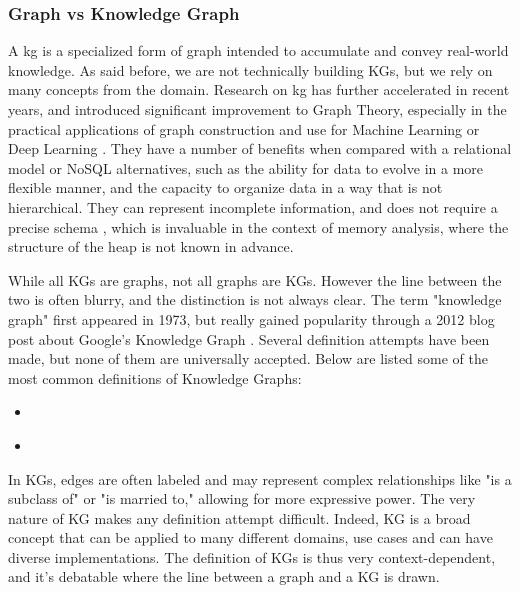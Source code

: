     \subsubsection{Graph vs Knowledge Graph}
    A \acrfull{kg} is a specialized form of graph intended to accumulate and convey real-world knowledge. As said before, we are not technically building KGs, but we rely on many concepts from the domain. Research on \acrshort{kg} has further accelerated in recent years, and introduced significant improvement to Graph Theory, especially in the practical applications of graph construction and use for Machine Learning or Deep Learning \cite{KG21}. They have a number of benefits when compared with a relational model or NoSQL alternatives, such as the ability for data to evolve in a more flexible manner, and the capacity to organize data in a way that is not hierarchical. They can represent incomplete information, and does not require a precise schema \cite[p.2]{KG21}, which is invaluable in the context of memory analysis, where the structure of the heap is not known in advance.

    While all KGs are graphs, not all graphs are KGs. However the line between the two is often blurry, and the distinction is not always clear. The term "knowledge graph" first appeared in 1973, but really gained popularity through a 2012 blog post about Google's Knowledge Graph \cite{googleblog2023knowledgegraph}. Several definition attempts have been made, but none of them are universally accepted. Below are listed some of the most common definitions of Knowledge Graphs:
    \begin{itemize}
        \item {} \cite{KG21}
        \item {} \cite{CKG23}
    \end{itemize}
    
    In KGs, edges are often labeled and may represent complex relationships like "is a subclass of" or "is married to," allowing for more expressive power. The very nature of KG makes any definition attempt difficult. Indeed, KG is a broad concept that can be applied to many different domains, use cases and can have diverse implementations. The definition of KGs is thus very context-dependent, and it's debatable where the line between a graph and a KG is drawn. 
    
